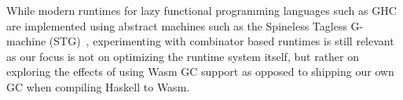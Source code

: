 While modern runtimes for lazy functional programming languages such as GHC are implemented using abstract machines such as the Spineless Tagless G-machine (STG)~\cite{stg}, experimenting with combinator based runtimes is still relevant as our focus is not on optimizing the runtime system itself, but rather on exploring the effects of using Wasm GC support as opposed to shipping our own GC when compiling Haskell to Wasm.